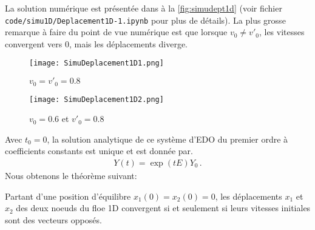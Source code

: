 La solution numérique est présentée dans à la \cref{fig:simudept1d} (voir fichier \verb|code/simu1D/Deplacement1D-1.ipynb| pour plus de détails). La plus grosse remarque à faire du point de vue numérique est que lorsque $v_0 \neq v'_0$, les vitesses convergent vers $0$, mais les déplacements diverge.
\begin{figure*}[!h]
    \centering

    \begin{subfigure}[t]{0.45\textwidth}
        \centering
        \texttt{[image: SimuDeplacement1D1.png]}
        \caption{$v_0=v'_0 = 0.8$}
    \end{subfigure}
    \begin{subfigure}[t]{0.45\textwidth}
        \centering
        \texttt{[image: SimuDeplacement1D2.png]}
        \caption{$v_0= 0.6$ et $v'_0 = 0.8$}
    \end{subfigure}

    \caption{Simulation du déplacement 1D d'un floe avec $m=1$, $k=18$, $\mu=1.3$, $t_{f}=5$. En règle générale, on observe le ralentissement du système et une convergence des déplacements vers l'état d'équilibre $Y_{eq}= (0,0,0,0)$ lorsque $v_0 = v'_0$.}
    \label{fig:simudept1d}
\end{figure*}

Avec $t_0= 0$, la solution analytique de ce système d'EDO du premier ordre à coefficients constants est unique et est donnée par.
\begin{align}
    Y(t) = \exp(tE)Y_0 \,.
\end{align}
Nous obtenons le théorème suivant:
\begin{theorem} \label{th:div1D}
    Partant d'une position d'équilibre $x_1(0) = x_2(0) = 0$, les déplacements $x_1$ et $x_2$ des deux noeuds du floe 1D convergent si et seulement si leurs vitesses initiales sont des vecteurs opposés.
\end{theorem}

